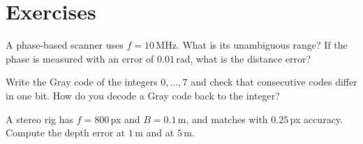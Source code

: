 \section*{Exercises}
\begin{exercise}
A phase-based scanner uses $f=10$\,MHz. What is its unambiguous range? If the phase is measured
with an error of $0.01$\,rad, what is the distance error?
\end{exercise}
\begin{exercise}
Write the Gray code of the integers $0,\dots,7$ and check that consecutive codes differ in one bit.
How do you decode a Gray code back to the integer?
\end{exercise}
\begin{exercise}
A stereo rig has $f=800$\,px and $B=0.1$\,m, and matches with $0.25$\,px accuracy. Compute the
depth error at $1$\,m and at $5$\,m.
\end{exercise}

